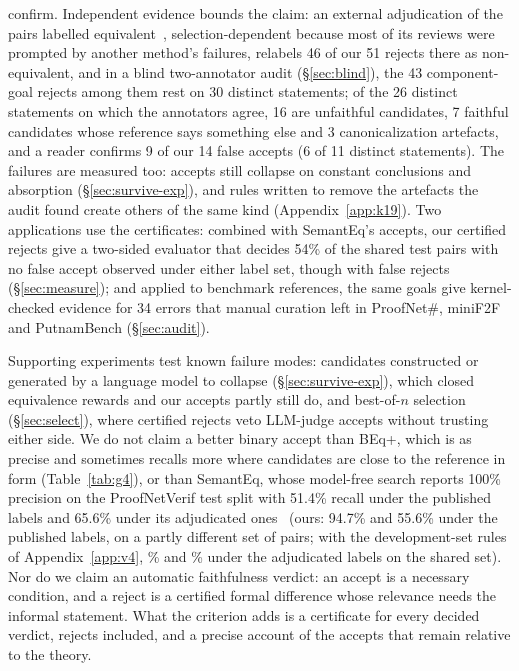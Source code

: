\documentclass[10pt]{article}
\theoremstyle{definition}
\begin{document}
\begin{enumerate}
confirm. Independent evidence bounds the claim: an external adjudication of the pairs labelled
equivalent~\cite{semanteq}, selection-dependent because most of its reviews were prompted by
another method's failures, relabels 46 of our 51 rejects there as non-equivalent, and in a blind
two-annotator audit (\S\ref{sec:blind}), the 43 component-goal rejects among them rest on 30
distinct statements; of the 26 distinct statements on which the annotators agree, 16 are
unfaithful candidates, 7 faithful candidates whose reference says something else and 3
canonicalization artefacts, and a reader confirms 9 of our 14 false accepts (6 of 11 distinct
statements). The failures are measured too: accepts still collapse on constant conclusions and
absorption (\S\ref{sec:survive-exp}), and rules written to remove the artefacts the audit found
create others of the same kind (Appendix~\ref{app:k19}). Two applications use the certificates:
combined with SemantEq's accepts, our certified rejects give a two-sided evaluator that decides
54\% of the shared test pairs with no false accept observed under either label set, though with
false rejects (\S\ref{sec:measure}); and applied to benchmark references, the same goals give
kernel-checked evidence for 34 errors that manual curation left in ProofNet\#, miniF2F and
PutnamBench (\S\ref{sec:audit}).
\end{enumerate}
Supporting experiments test known failure modes: candidates constructed or generated by a
language model to collapse (\S\ref{sec:survive-exp}), which closed equivalence rewards and our
accepts partly still do, and best-of-$n$ selection (\S\ref{sec:select}), where certified rejects
veto LLM-judge accepts without trusting either side.
We do not claim a better binary accept than BEq+, which is as precise and sometimes recalls more
where candidates are close to the reference in form (Table~\ref{tab:g4}), or than SemantEq, whose
model-free search reports 100\% precision on the ProofNetVerif test split with 51.4\% recall
under the published labels and 65.6\% under its adjudicated ones~\cite{semanteq} (ours: 94.7\%
and 55.6\% under the published labels, on a partly different set of pairs; with the development-set
rules of Appendix~\ref{app:v4}, \VfSharedVfourPrec\% and \VfSharedVfourRecall\% under the adjudicated
labels on the shared set). Nor do we claim an
automatic faithfulness verdict: an accept is a necessary condition, and a reject is a certified
formal difference whose relevance needs the informal statement. What the criterion adds is a
certificate for every decided verdict, rejects included, and a precise account of the accepts
that remain relative to the theory.
\end{document}
